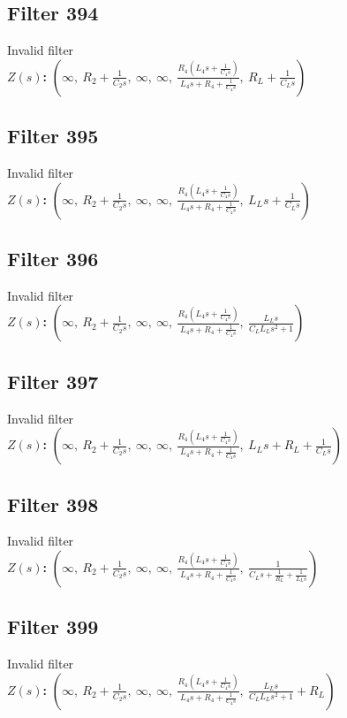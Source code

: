\documentclass{article}
\begin{document}
\subsection*{Filter 394}
Invalid filter \\ 
\textbf{$Z(s)$:} $\left( \infty, \  R_{2} + \frac{1}{C_{2} s}, \  \infty, \  \infty, \  \frac{R_{4} \left(L_{4} s + \frac{1}{C_{4} s}\right)}{L_{4} s + R_{4} + \frac{1}{C_{4} s}}, \  R_{L} + \frac{1}{C_{L} s}\right)$ \\ 
\subsection*{Filter 395}
Invalid filter \\ 
\textbf{$Z(s)$:} $\left( \infty, \  R_{2} + \frac{1}{C_{2} s}, \  \infty, \  \infty, \  \frac{R_{4} \left(L_{4} s + \frac{1}{C_{4} s}\right)}{L_{4} s + R_{4} + \frac{1}{C_{4} s}}, \  L_{L} s + \frac{1}{C_{L} s}\right)$ \\ 
\subsection*{Filter 396}
Invalid filter \\ 
\textbf{$Z(s)$:} $\left( \infty, \  R_{2} + \frac{1}{C_{2} s}, \  \infty, \  \infty, \  \frac{R_{4} \left(L_{4} s + \frac{1}{C_{4} s}\right)}{L_{4} s + R_{4} + \frac{1}{C_{4} s}}, \  \frac{L_{L} s}{C_{L} L_{L} s^{2} + 1}\right)$ \\ 
\subsection*{Filter 397}
Invalid filter \\ 
\textbf{$Z(s)$:} $\left( \infty, \  R_{2} + \frac{1}{C_{2} s}, \  \infty, \  \infty, \  \frac{R_{4} \left(L_{4} s + \frac{1}{C_{4} s}\right)}{L_{4} s + R_{4} + \frac{1}{C_{4} s}}, \  L_{L} s + R_{L} + \frac{1}{C_{L} s}\right)$ \\ 
\subsection*{Filter 398}
Invalid filter \\ 
\textbf{$Z(s)$:} $\left( \infty, \  R_{2} + \frac{1}{C_{2} s}, \  \infty, \  \infty, \  \frac{R_{4} \left(L_{4} s + \frac{1}{C_{4} s}\right)}{L_{4} s + R_{4} + \frac{1}{C_{4} s}}, \  \frac{1}{C_{L} s + \frac{1}{R_{L}} + \frac{1}{L_{L} s}}\right)$ \\ 
\subsection*{Filter 399}
Invalid filter \\ 
\textbf{$Z(s)$:} $\left( \infty, \  R_{2} + \frac{1}{C_{2} s}, \  \infty, \  \infty, \  \frac{R_{4} \left(L_{4} s + \frac{1}{C_{4} s}\right)}{L_{4} s + R_{4} + \frac{1}{C_{4} s}}, \  \frac{L_{L} s}{C_{L} L_{L} s^{2} + 1} + R_{L}\right)$ \\ 
\end{document}
